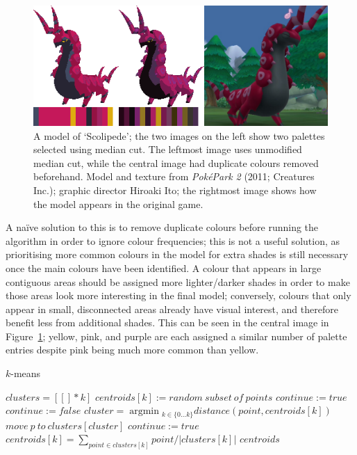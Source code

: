 \documentclass[12pt,twoside,notitlepage]{report}
\DeclareMathOperator*{\argmin}{argmin}
\begin{document}
\begin{figure}[h!]
\centering
\includegraphics[width=\textwidth]{mediancut}
\caption{A model of `Scolipede'; the two images on the left show two palettes selected using median cut. The leftmost image uses unmodified median cut, while the central image had duplicate colours removed beforehand. Model and texture from \textit{Pok\'{e}Park 2} (2011; Creatures Inc.); graphic director Hiroaki Ito; the rightmost image shows how the model appears in the original game.}
\label{fig:mediancutexample}
\end{figure}

A na\"{i}ve solution to this is to remove duplicate colours before running the algorithm in order to ignore colour frequencies; this is not a useful solution, as prioritising more common colours in the model for extra shades is still necessary once the main colours have been identified. A colour that appears in large contiguous areas should be assigned more lighter/darker shades in order to make those areas look more interesting in the final model; conversely, colours that only appear in small, disconnected areas already have visual interest, and therefore benefit less from additional shades. This can be seen in the central image in Figure~\ref{fig:mediancutexample}; yellow, pink, and purple are each assigned a similar number of palette entries despite pink being much more common than yellow.

\begin{algorithm}
\caption{$k$-means}
\label{alg:kmeans}
\begin{algorithmic}[1]
\State$clusters = [ [] * k ]$
\State$centroids[k] := random\ subset\ of\ points$
\State$continue := true$
	\State$continue := false$
		\State$cluster = \argmin{_{k \in \{0...k\}}distance(point, centroids[k])}$
			\State$move\ p\ to\ clusters[cluster]$
			\State$continue := true$
		\EndIf
	\EndFor
		\State$centroids[k] = \sum_{point \in clusters[k]}point / |clusters[k]|$
	\EndFor
\EndWhile
\State\Return$centroids$
\end{algorithmic}
\end{algorithm}
\end{document}
